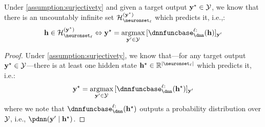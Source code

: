 \newcommand{\hiddenstatetargetclass}{\hiddenstates^{\star}}
\begin{lemma}\label{theorem:infinite_class_points}
    Under \cref{assumption:surjectivety} and given a target output ${\mathbf{y}^{\star}} \in \mathcal{Y}$,
    we know that there is an uncountably infinite set $\AllActivationsLayerClass$ which predicts it, i.e.,:
    \begin{align}
        \hiddenstates\in\AllActivationsLayerClass\Leftrightarrow \class=\argmax_{\by'\in\calY}{[\dnnfunclayer{\layer:}(\hiddenstates)]_{\by'}}
    \end{align}
\end{lemma}
\begin{proof}
     Under \cref{assumption:surjectivety}, we know that---for any target output ${\mathbf{y}^{\star}} \in \mathcal{Y}$---there is at least one hidden state $\hiddenstatetargetclass \in \R^{|\neuronset_\layer|}$ which predicts it, i.e.:
     \begin{align}
          \bystar = \argmax_{\by'\in\calY}{[\dnnfunclayer{\layer:}(\hiddenstatetargetclass)]_{\by'}} 
     \end{align}
     where we note that $\dnnfunclayer{\layer:}(\hiddenstatetargetclass)$ outputs a probability distribution over $\mathcal{Y}$, i.e., $\pdnn(\by' \mid \hiddenstatetargetclass)$.
     

\end{proof}
